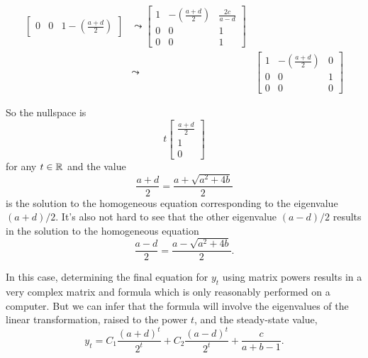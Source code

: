 \documentclass[../MathsNotesBase.tex]{subfiles}
\begin{document}
{\begin{align*}
\begin{bmatrix}
			0   &  0 & 1-(\frac{a + d}{2})	
		\end{bmatrix} &\leadsto 
		\begin{bmatrix}
			1   & -(\frac{a + d}{2}) & \frac{2c}{a - d} \\[4pt]
			0   &  0 & 1 \\[4pt]
			0   &  0 & 1	
		\end{bmatrix}  \\[4pt]
		&\leadsto &
		\begin{bmatrix}
			1   & -(\frac{a + d}{2}) & 0 \\[4pt]
			0   &  0 & 1 \\[4pt]
			0   &  0 & 0
		\end{bmatrix}
		\end{align*}
		
		So the nullspace is
		\[ t\begin{bmatrix}
				\frac{a + d}{2} \\[4pt] 1 \\[4pt] 0	
			\end{bmatrix} 
		\]
		for any ${ t \in \mathbb{R}^{} }$ and the value
		\[ \frac{a + d}{2} = \frac{a + \sqrt{a^2 + 4b}}{2} \]
		is the solution to the homogeneous equation corresponding to the eigenvalue ${ (a+d)/2 }$. It's also not hard to see that the other eigenvalue ${ (a-d)/2 }$ results in the solution to the homogeneous equation
		\[ \frac{a - d}{2} = \frac{a - \sqrt{a^2 + 4b}}{2}. \]
		
		\medskip
	
		\medskip
		In this case, determining the final equation for ${ y_t }$ using matrix powers results in a very complex matrix and formula which is only reasonably performed on a computer. But we can infer that the formula will involve the eigenvalues of the linear transformation, raised to the power $t$, and the steady-state value,
		\[ y_t = C_1 \frac{(a+d)^t}{2^t} + C_2 \frac{(a-d)^t}{2^t} + \frac{c}{a+b-1}. \]
		
}
\end{document}
